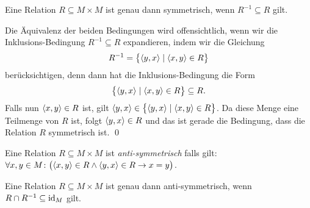 \begin{Satz}
Eine Relation $R \subseteq M \times M$ ist genau dann symmetrisch, wenn $R^{-1} \subseteq R$ gilt.
\end{Satz}

\proof
Die \"{A}quivalenz der beiden Bedingungen wird offensichtlich, wenn wir die Inklusions-Bedingung
$R^{-1} \subseteq R$ expandieren, indem wir die Gleichung
\[ R^{-1} = \bigl\{ \pair(y,x) \mid \pair(x,y) \in R \bigr\}  \]
ber\"{u}cksichtigen, denn dann hat die Inklusions-Bedingung die Form
\[ \bigl\{ \pair(y,x) \mid \pair(x,y) \in R \bigr\} \subseteq  R. \]
Falls nun $\pair(x,y) \in R$ ist, gilt $\pair(y,x) \in \bigl\{ \pair(y,x) \mid \pair(x,y) \in R \bigr\}$.
Da diese Menge eine Teilmenge von $R$ ist, folgt $\pair(y,x)  \in R$ und das ist gerade die Bedingung, dass
die Relation $R$ symmetrisch ist. \qed

\begin{Definition}
Eine Relation $R \subseteq M \times M$  ist \emph{anti-symmetrisch} falls gilt: \\[0.2cm]
\hspace*{1.3cm} 
$\forall x, y \in M \colon \bigl(\pair(x,y) \in R \wedge \pair(y,x) \in R \rightarrow x = y\bigr)$. \eox
\end{Definition}

\begin{Satz}
Eine Relation $R \subseteq M \times M$  ist genau dann anti-symmetrisch, wenn
$R \cap R^{-1} \subseteq \mbox{\rm id}_{M}$ gilt.
\end{Satz}
\pagebreak

